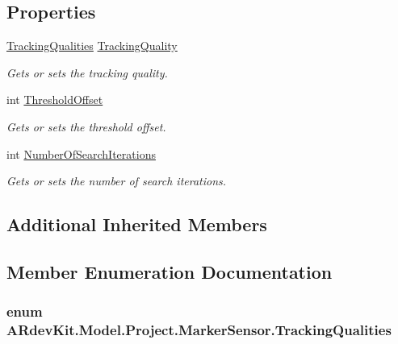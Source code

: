 \subsection*{Properties}
\begin{DoxyCompactItemize}
\item 
\hyperlink{class_a_rdev_kit_1_1_model_1_1_project_1_1_marker_sensor_adf403b5a2cee12e9f0006bd431cf569f}{Tracking\-Qualities} \hyperlink{class_a_rdev_kit_1_1_model_1_1_project_1_1_marker_sensor_ad8681106fa33f5473799f0e0ed6999bc}{Tracking\-Quality}
\begin{DoxyCompactList}\small\item\em Gets or sets the tracking quality. \end{DoxyCompactList}\item 
int \hyperlink{class_a_rdev_kit_1_1_model_1_1_project_1_1_marker_sensor_a704b4bc065e8b27d457c2cfbedee7a79}{Threshold\-Offset}
\begin{DoxyCompactList}\small\item\em Gets or sets the threshold offset. \end{DoxyCompactList}\item 
int \hyperlink{class_a_rdev_kit_1_1_model_1_1_project_1_1_marker_sensor_a106f06e0fb75947b4748a392e7a520b7}{Number\-Of\-Search\-Iterations}
\begin{DoxyCompactList}\small\item\em Gets or sets the number of search iterations. \end{DoxyCompactList}\end{DoxyCompactItemize}
\subsection*{Additional Inherited Members}


\subsection{Member Enumeration Documentation}
\hypertarget{class_a_rdev_kit_1_1_model_1_1_project_1_1_marker_sensor_adf403b5a2cee12e9f0006bd431cf569f}{
\subsubsection[{Tracking\-Qualities}]{\setlength{\rightskip}{0pt plus 5cm}enum {\bf A\-Rdev\-Kit.\-Model.\-Project.\-Marker\-Sensor.\-Tracking\-Qualities}}}\label{class_a_rdev_kit_1_1_model_1_1_project_1_1_marker_sensor_adf403b5a2cee12e9f0006bd431cf569f}


